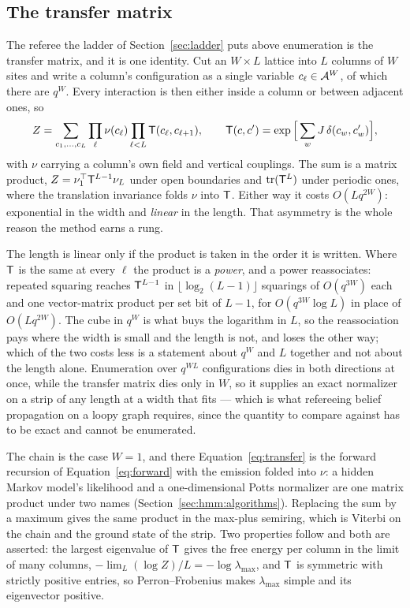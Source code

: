 \documentclass[11pt,a4paper]{article}
\begin{document}
\subsection{The transfer matrix}
\label{sec:transfer-matrix}
The referee the ladder of Section~\ref{sec:ladder} puts above enumeration is
the transfer matrix, and it is one identity. Cut an $W \times L$ lattice into
$L$ columns of $W$ sites and write a column's configuration as a single
variable $c_\ell \in \mathcal{A}^{W}$, of which there are $q^{W}$. Every
interaction is then either inside a column or between adjacent ones, so
\begin{equation}
  Z = \sum_{c_1, \dots, c_L} \prod_{\ell} \nu(c_\ell)
      \prod_{\ell < L} \mathsf{T}(c_\ell, c_{\ell+1}),
  \qquad
  \mathsf{T}(c, c') = \exp\Big[ \sum_{w} J\,\delta(c_w, c'_w) \Big],
  \label{eq:transfer}
\end{equation}
with $\nu$ carrying a column's own field and vertical couplings. The sum is
a matrix product, $Z = \nu_1^{\top} \mathsf{T}^{L-1} \nu_L$ under open
boundaries and $\operatorname{tr}(\mathsf{T}^{L})$ under periodic ones, where
the translation invariance folds $\nu$ into $\mathsf{T}$. Either way it costs
$O(L q^{2W})$: exponential in the width and
\emph{linear} in the length. That asymmetry is the whole reason the method
earns a rung.

The length is linear only if the product is taken in the order it is written.
Where $\mathsf{T}$ is the same at every $\ell$ the product is a \emph{power},
and a power reassociates: repeated squaring reaches $\mathsf{T}^{L-1}$ in
$\lfloor \log_2 (L-1) \rfloor$ squarings of $O(q^{3W})$ each and one
vector-matrix product per set bit of $L-1$, for $O(q^{3W} \log L)$ in place of
$O(L q^{2W})$. The cube in $q^{W}$ is what buys the logarithm in $L$, so the
reassociation pays where the width is small and the length is not, and loses
the other way; which of the two costs less is a statement about $q^{W}$ and
$L$ together and not about the length alone. Enumeration over $q^{WL}$ configurations dies in both
directions at once, while the transfer matrix dies only in $W$, so it supplies
an exact normalizer on a strip of any length at a width that fits --- which is
what refereeing belief propagation on a loopy graph requires, since the
quantity to compare against has to be exact and cannot be enumerated.

The chain is the case $W = 1$, and there Equation~\ref{eq:transfer} is the
forward recursion of Equation~\ref{eq:forward} with the emission folded into
$\nu$: a hidden Markov model's likelihood and a one-dimensional Potts
normalizer are one matrix product under two names
(Section~\ref{sec:hmm:algorithms}). Replacing the sum by a maximum gives the
same product in the max-plus semiring, which is Viterbi on the chain and the
ground state of the strip. Two properties follow and both are asserted: the
largest eigenvalue of $\mathsf{T}$ gives the free energy per column in the
limit of many columns, $-\lim_{L} (\log Z)/L = -\log \lambda_{\max}$, and
$\mathsf{T}$ is symmetric with strictly positive entries, so
Perron--Frobenius makes $\lambda_{\max}$ simple and its eigenvector
positive.
\end{document}
